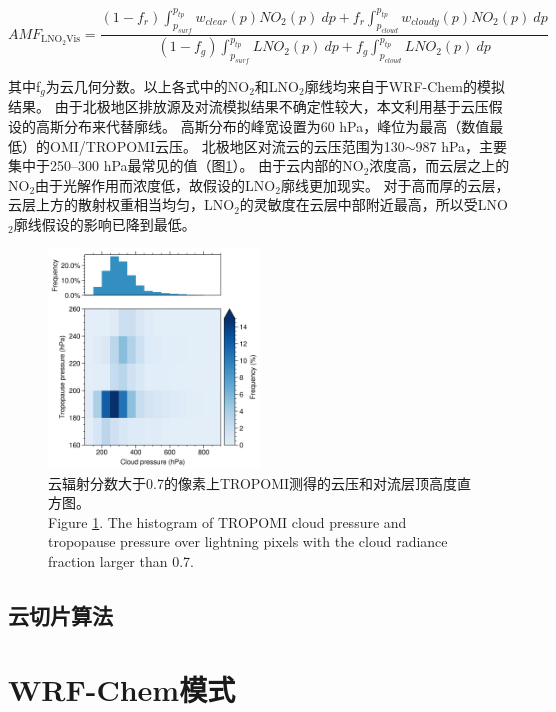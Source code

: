 \begin{equation} \label{eq:AMF_LNO2Vis}
AMF_{\textrm{LNO$_2$Vis}} = \frac{(1-f_r) \int_{p_{surf}}^{p_{tp}} w_{clear}(p) NO_2(p) \: dp + f_r \int_{p_{cloud}}^{p_{tp}} w_{cloudy}(p) NO_2(p) \: dp}{(1-f_g) \int_{p_{surf}}^{p_{tp}} LNO_2(p) \: dp + f_g \int_{p_{cloud}}^{p_{tp}} LNO_2(p) \: dp}
\end{equation}

其中f$_g$为云几何分数。以上各式中的NO$_2$和LNO$_2$廓线均来自于WRF-Chem的模拟结果。
由于北极地区排放源及对流模拟结果不确定性较大，本文利用基于云压假设的高斯分布来代替廓线。
高斯分布的峰宽设置为60 hPa，峰位为最高（数值最低）的OMI/TROPOMI云压。
北极地区对流云的云压范围为130$\sim$987 hPa，主要集中于250--300 hPa最常见的值（图\ref{fig:pcld_ptropo}）。
由于云内部的NO$_2$浓度高，而云层之上的NO$_2$由于光解作用而浓度低，故假设的LNO$_2$廓线更加现实\citep{Beirle.2009}。
对于高而厚的云层，云层上方的散射权重相当均匀，LNO$_2$的灵敏度在云层中部附近最高，所以受LNO$_2$廓线假设的影响已降到最低\citep{Laughner.2017}。

\begin{figure}[htbp]
\centering
\includegraphics[width=0.5\textwidth]{./figures/pcld_ptropo.png}
\caption{云辐射分数大于0.7的像素上TROPOMI测得的云压和对流层顶高度直方图。\\
Figure \ref{fig:pcld_ptropo}. The histogram of TROPOMI cloud pressure and tropopause pressure over lightning
pixels with the cloud radiance fraction larger than 0.7.
}
\label{fig:pcld_ptropo}
\end{figure}

\subsection{云切片算法} \label{sec:云切片算法}

\section{WRF-Chem模式}

